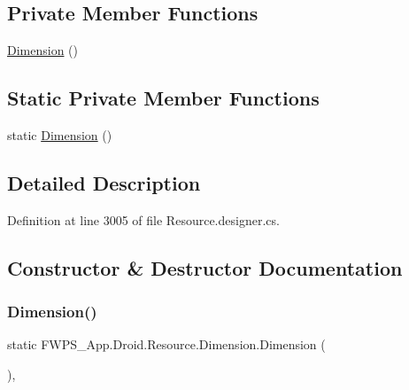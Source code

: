 \subsection*{Private Member Functions}
\begin{DoxyCompactItemize}
\item 
\mbox{\hyperlink{class_f_w_p_s___app_1_1_droid_1_1_resource_1_1_dimension_a64c68cdb809263f98f96147d5cc46a42}{Dimension}} ()
\end{DoxyCompactItemize}
\subsection*{Static Private Member Functions}
\begin{DoxyCompactItemize}
\item 
static \mbox{\hyperlink{class_f_w_p_s___app_1_1_droid_1_1_resource_1_1_dimension_abb95311452c0c659510df73b3949b287}{Dimension}} ()
\end{DoxyCompactItemize}


\subsection{Detailed Description}


Definition at line 3005 of file Resource.\+designer.\+cs.



\subsection{Constructor \& Destructor Documentation}
\mbox{\label{class_f_w_p_s___app_1_1_droid_1_1_resource_1_1_dimension_abb95311452c0c659510df73b3949b287}} 
\subsubsection{\texorpdfstring{Dimension()}{Dimension()}\hspace{0.1cm}{\footnotesize\ttfamily [1/2]}}
{\footnotesize\ttfamily static F\+W\+P\+S\+\_\+\+App.\+Droid.\+Resource.\+Dimension.\+Dimension (\begin{DoxyParamCaption}{ }\end{DoxyParamCaption})\hspace{0.3cm}{\ttfamily [static]}, {\ttfamily [private]}}



